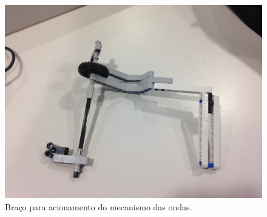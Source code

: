 \documentclass{article}
\begin{document}
	\begin{figure}[h!]
		\includegraphics[width=\linewidth]{images/Garra_3.JPG}
		\caption{Braço para acionamento do mecanismo das ondas.}
		\label{fig:claw_3}
	\end{figure}
\end{document}

